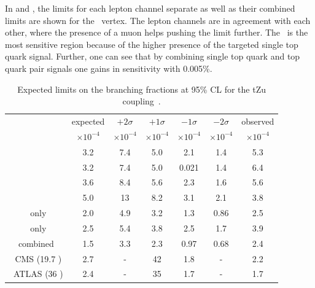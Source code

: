 In  and , the limits for each lepton channel separate as well as their combined limits are shown for the \Zut\ vertex. The lepton channels are in agreement with each other, where the presence of a muon helps pushing the limit further. The \STSR\ is the most sensitive region because of the higher presence of the targeted single top quark signal. Further, one can see that by combining single top quark and top quark pair signals  one gains in sensitivity with 0.005\%.
\begin{table}[htbp]
	\centering
	\caption{Expected limits on the branching fractions at 95\% CL for the tZu coupling~\cite{Sirunyan:2017kkr,ATLAS-CONF-2017-070}.}
	\begin{tabular}{ccccccc}
		\toprule
		& expected & $+2\sigma$ & $+1\sigma$ & $-1\sigma$ & $-2\sigma$ & observed \\ 
		& $\times 10^{-4}$ & $\times 10^{-4}$ & $\times 10^{-4}$ & $\times 10^{-4}$ & $\times 10^{-4}$ & $\times 10^{-4}$ \\
		\midrule
		\mumumu\ &3.2  & 7.4  & 5.0  & 2.1  &1.4  & 5.3  \\ 
	
		\emumu\ & 3.2  & 7.4  & 5.0  & 0.021  & 1.4  & 6.4  \\ 
		
		\eemu\ & 3.6  & 8.4  & 5.6  & 2.3  & 1.6  & 5.6  \\ 
		
		\eee\ & 5.0  & 13  & 8.2  &3.1  & 2.1  & 3.8  \B \\ 
		\hdashline
		\STSR\ only &2.0  & 4.9  & 3.2  & 1.3  & 0.86  & 2.5   \T\\ 
		
		\TTSR\ only & 2.5  & 5.4  & 3.8  & 2.5  & 1.7  & 3.9  \B \\ 
		\hdashline
		combined & 1.5  & 3.3  & 2.3  & 0.97  & 0.68  & 2.4   \T \B\\ 
		\hdashline
		8 \TeV\ CMS (19.7 \fbinv)   &2.7  & -   & 42  & 1.8  & -  & 2.2   \T\B\\
		\hdashline
		13 \TeV\ ATLAS (36 \fbinv)   & 2.4  & -  &   35  &1.7 & -  & 1.7  \T\\
		
		\bottomrule
	\end{tabular} 
	\label{tab:ResultsTZU}
\end{table}
